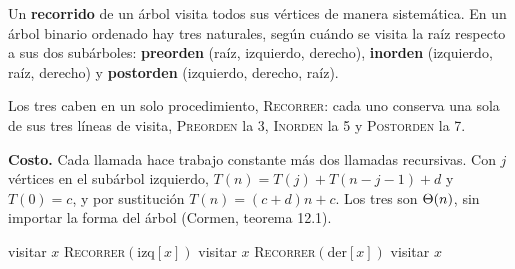 \documentclass[11pt,letterpaper]{article}
\begin{document}
Un \textbf{recorrido} de un árbol visita todos sus vértices de manera
sistemática. En un árbol binario ordenado hay tres naturales, según
cuándo se visita la raíz respecto a sus dos subárboles:
\textbf{preorden} (raíz, izquierdo, derecho), \textbf{inorden}
(izquierdo, raíz, derecho) y \textbf{postorden} (izquierdo, derecho,
raíz).

Los tres caben en un solo procedimiento, \textsc{Recorrer}: cada uno
conserva una sola de sus tres líneas de visita, \textsc{Preorden} la
3, \textsc{Inorden} la 5 y \textsc{Postorden} la 7.

\textbf{Costo.} Cada llamada hace trabajo constante más dos llamadas
recursivas. Con $j$ vértices en el subárbol izquierdo,
$T(n) = T(j) + T(n - j - 1) + d$ y $T(0) = c$, y por sustitución
$T(n) = (c + d)n + c$. Los tres son $\Theta\!\left(n\right)$, sin importar la forma
del árbol (Cormen, teorema 12.1).

\begin{algorithm}[H]
\caption{\textsc{Recorrer}$(x)$: los tres recorridos de un árbol
         binario}
\label{alg:arbol-recorridos}
\begin{algorithmic}[1]
    \State visitar $x$ 
    \State \textsc{Recorrer}$(\text{izq}[x])$
    \State visitar $x$ 
    \State \textsc{Recorrer}$(\text{der}[x])$
    \State visitar $x$ 
  \EndIf
\EndProcedure
\end{algorithmic}
\end{algorithm}
\end{document}
